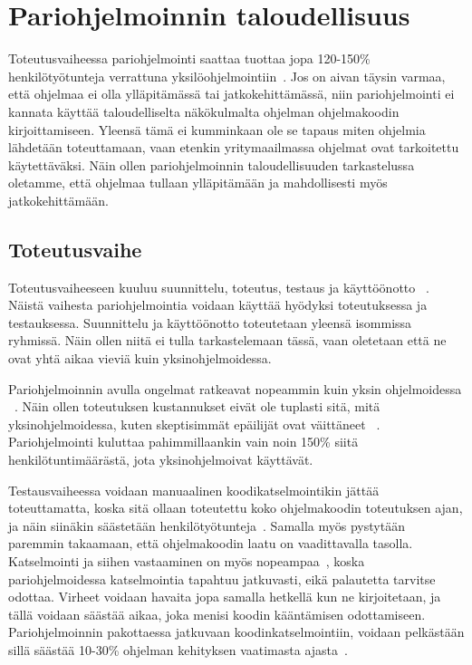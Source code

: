 \documentclass[finnish]{tktltiki2}
\theoremstyle{definition}
\theoremstyle{remark}
\begin{document}
\section{Pariohjelmoinnin taloudellisuus}

Toteutusvaiheessa pariohjelmointi saattaa tuottaa jopa 120-150\% henkilötyötunteja verrattuna yksilöohjelmointiin~\cite{williams01support}. Jos on aivan täysin varmaa, että ohjelmaa ei olla ylläpitämässä tai jatkokehittämässä, niin pariohjelmointi ei kannata käyttää taloudelliselta näkökulmalta ohjelman ohjelmakoodin kirjoittamiseen. Yleensä tämä ei kumminkaan ole se tapaus miten ohjelmia lähdetään toteuttamaan, vaan etenkin yritymaailmassa ohjelmat ovat tarkoitettu käytettäväksi. Näin ollen pariohjelmoinnin taloudellisuuden tarkastelussa oletamme, että ohjelmaa tullaan ylläpitämään ja mahdollisesti myös jatkokehittämään.

\subsection{Toteutusvaihe}

Toteutusvaiheeseen kuuluu suunnittelu, toteutus, testaus ja käyttöönotto  ~\cite{sommerville1998requirements}. Näistä vaihesta pariohjelmointia voidaan käyttää hyödyksi toteutuksessa ja testauksessa. Suunnittelu ja käyttöönotto toteutetaan yleensä isommissa ryhmissä. Näin ollen niitä ei tulla tarkastelemaan tässä, vaan oletetaan että ne ovat yhtä aikaa vieviä kuin yksinohjelmoidessa.

Pariohjelmoinnin avulla ongelmat ratkeavat nopeammin kuin yksin ohjelmoidessa ~\cite{costandbenefit}. Näin ollen toteutuksen kustannukset eivät ole tuplasti sitä, mitä yksinohjelmoidessa, kuten skeptisimmät epäilijät ovat väittäneet ~\cite{costandbenefit2}. Pariohjelmointi kuluttaa pahimmillaankin vain noin 150\% siitä henkilötuntimäärästä, jota yksinohjelmoivat käyttävät.

Testausvaiheessa voidaan manuaalinen koodikatselmointikin jättää toteuttamatta, koska sitä ollaan toteutettu koko ohjelmakoodin toteutuksen ajan, ja näin siinäkin säästetään henkilötyötunteja~\cite{nawrocki01exp}. Samalla myös pystytään paremmin takaamaan, että ohjelmakoodin laatu on vaadittavalla tasolla. Katselmointi ja siihen vastaaminen on myös nopeampaa~\cite{costandbenefit2}, koska pariohjelmoidessa katselmointia tapahtuu jatkuvasti, eikä palautetta tarvitse odottaa. Virheet voidaan havaita jopa samalla hetkellä kun ne kirjoitetaan, ja tällä voidaan säästää aikaa, joka menisi koodin kääntämisen odottamiseen. Pariohjelmoinnin pakottaessa jatkuvaan koodinkatselmointiin, voidaan pelkästään sillä säästää 10-30\% ohjelman kehityksen vaatimasta ajasta~\cite{gilb1993software}.
\end{document}
